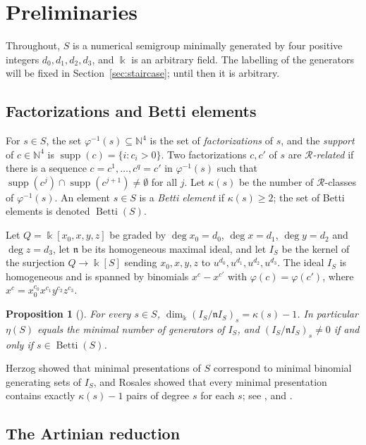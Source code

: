 \documentclass{amsart}
\newtheorem{proposition}[theorem]{Proposition}
\theoremstyle{definition}
\theoremstyle{remark}
\numberwithin{equation}{section}
\newcommand{\N}{\mathbb{N}}
\newcommand{\kk}{\Bbbk}
\newcommand{\fn}{\mathfrak{n}}
\newcommand{\cR}{\mathcal{R}}
\DeclareMathOperator{\Betti}{Betti}
\DeclareMathOperator{\supp}{supp}
\begin{document}
\section{Preliminaries}\label{sec:prelim}

Throughout, $S$ is a numerical semigroup minimally generated by four positive integers $d_0,d_1,d_2,d_3$, and $\kk$ is an arbitrary field. The labelling of the generators will be fixed in Section~\ref{sec:staircase}; until then it is arbitrary.

\subsection{Factorizations and Betti elements}

For $s\in S$, the set $\varphi^{-1}(s)\subseteq\N^4$ is the set of \emph{factorizations} of $s$, and the \emph{support} of $c\in\N^4$ is $\supp(c)=\{i : c_i>0\}$. Two factorizations $c,c'$ of $s$ are \emph{$\cR$-related} if there is a sequence $c=c^1,\dots,c^q=c'$ in $\varphi^{-1}(s)$ such that $\supp(c^j)\cap\supp(c^{j+1})\neq\emptyset$ for all $j$. Let $\kappa(s)$ be the number of $\cR$-classes of $\varphi^{-1}(s)$. An element $s\in S$ is a \emph{Betti element} if $\kappa(s)\ge2$; the set of Betti elements is denoted $\Betti(S)$.

Let $Q=\kk[x_0,x,y,z]$ be graded by $\deg x_0=d_0$, $\deg x=d_1$, $\deg y=d_2$ and $\deg z=d_3$, let $\fn$ be its homogeneous maximal ideal, and let $I_S$ be the kernel of the surjection $Q\to\kk[S]$ sending $x_0,x,y,z$ to $u^{d_0},u^{d_1},u^{d_2},u^{d_3}$. The ideal $I_S$ is homogeneous and is spanned by binomials $x^c-x^{c'}$ with $\varphi(c)=\varphi(c')$, where $x^c=x_0^{c_0}x^{c_1}y^{c_2}z^{c_3}$.

\begin{proposition}[\cite{Her70,Ros96}]\label{prop:herzog-rosales}
For every $s\in S$, $\dim_\kk(I_S/\fn I_S)_s=\kappa(s)-1$. In particular $\eta(S)$ equals the minimal number of generators of $I_S$, and $(I_S/\fn I_S)_s\neq0$ if and only if $s\in\Betti(S)$.
\end{proposition}

Herzog \cite{Her70} showed that minimal presentations of $S$ correspond to minimal binomial generating sets of $I_S$, and Rosales \cite{Ros96} showed that every minimal presentation contains exactly $\kappa(s)-1$ pairs of degree $s$ for each $s$; see \cite[Theorem~3.1]{Cho26}, \cite{RGS09} and \cite{Sta18}.

\subsection{The Artinian reduction}
\end{document}
